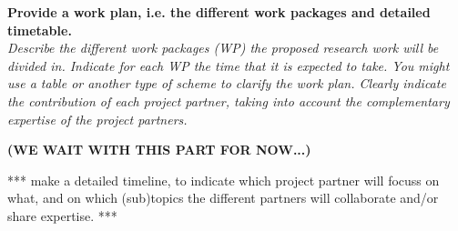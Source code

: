 \documentclass[11pt,dvipsnames,usenames,a4paper]{article}
\begin{document}
%

\vspace{7pt}

\textbf{Provide a work plan, i.e. the different work packages and detailed timetable.}\\
\textit{Describe the different work packages (WP) the proposed research work will be divided in.
Indicate for each WP the time that it is expected to take.
You might use a table or another type of scheme to clarify the work plan. Clearly indicate the contribution of each project partner, taking into account the complementary expertise of the project partners.}


{\bf\color{blue} (WE WAIT WITH THIS PART FOR NOW...)}

*** make a detailed timeline, to indicate which project partner will focuss on what, and on which (sub)topics the different partners will collaborate and/or share expertise. ***
\end{document}
